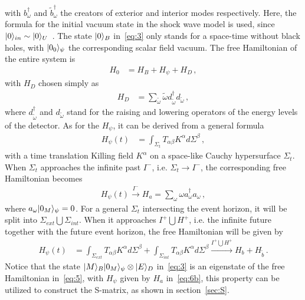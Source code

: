 \documentclass[12pt,a4paper]{article}
\begin{document}
with $b_{\omega}^{\dag}$ and $\tilde{b}_{\omega}^{\dag}$ the creators of exterior and interior modes respectively. Here, the formula for the initial vacuum state in the shock wave model is used, since $\arrowvert0\rangle_{in}\sim \arrowvert0\rangle_{U}$~\cite{j}. The state $\arrowvert0\rangle_{B}$ in~\eqref{eq:3} only stands for a space-time without black holes, with $\arrowvert0_0\rangle_{\psi}$ the corresponding scalar field vacuum. The free
Hamiltonian of the entire system is
\begin{equation}
\label{eq:5}
\begin{split}
H_0 &= H_B+H_{\psi}+H_D \,,
\end{split}
\end{equation}
with $H_D$ chosen simply as
\begin{equation}
\label{eq:6}
\begin{split}
H_D &=
\sum_{\tilde{\omega}}\tilde{\omega}d_{\tilde{\omega}}^{\dag}d_{\tilde{\omega}}
\,,
\end{split}
\end{equation}
where $d^{\dag}_{\tilde{\omega}}$ and $d_{\tilde{\omega}}$ stand for the
raising and lowering operators of the energy levels of the
detector. As for the $H_{\psi}$, it can be derived from a general formula
\begin{equation}
\label{eq:6a}
\begin{split}
H_{\psi}(t) &= \int_{\Sigma_t}T_{\alpha\beta}K^{\alpha}d\Sigma^{\beta}
\,,
\end{split}
\end{equation}
with a time translation Killing field $K^{\alpha}$ on a space-like Cauchy hypersurface $\Sigma_t$. When $\Sigma_t$ approaches the infinite past $I^-$, i.e. $\Sigma_t\rightarrow I^-$, the corresponding free Hamiltonian becomes
\begin{equation}
\label{eq:6b}
\begin{split}
H_{\psi}(t) \stackrel{I^-}{\longrightarrow} H_{a}=\sum_{\omega}\omega a_{\omega}^{\dag}a_{\omega}
\,,
\end{split}
\end{equation}
where $a_{\omega}\arrowvert0_{M}\rangle_{\psi}=0$. For a general $\Sigma_t$ intersecting the event horizon, it will be split into $\Sigma_{ext}\bigcup\Sigma_{int}$. When it approaches $I^+\bigcup H^+$, i.e. the infinite future together with the future event horizon, the free Hamiltonian will be given by
\begin{equation}
\label{eq:6c}
\begin{split}
H_{\psi}(t) &= \int_{\Sigma_{ext}}T_{\alpha\beta}K^{\alpha}d\Sigma^{\beta}+\int_{\Sigma_{int}}T_{\alpha\beta}K^{\alpha}d\Sigma^{\beta}\stackrel{I^+\bigcup H^+}{\longrightarrow} H_{b}+H_{\tilde{b}}
\,.
\end{split}
\end{equation}
Notice that the state $\arrowvert
M\rangle_{B}\arrowvert0_{M}\rangle_{\psi}\otimes\arrowvert
E\rangle_D$ in~\eqref{eq:3} is an eigenstate of the free Hamiltonian in~\eqref{eq:5}, with $H_{\psi}$ given by $H_{a}$ in~\eqref{eq:6b}, this property can be utilized to construct the S-matrix, as shown in section~\ref{sec:S}.
\end{document}
